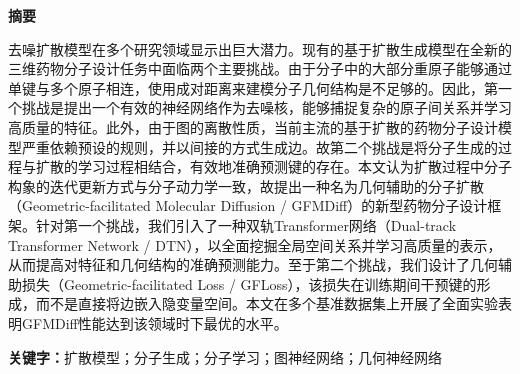 \cleardoublepage{}
\thispagestyle{previous}
\pagestyle{previous}
\setcounter{page}{1}

\clearpage
{}
\begin{center}
    \textbf{  \heiti 摘\quad 要}
\end{center}
\songti {}

去噪扩散模型在多个研究领域显示出巨大潜力。现有的基于扩散生成模型在全新的三维药物分子设计任务中面临两个主要挑战。由于分子中的大部分重原子能够通过单键与多个原子相连，使用成对距离来建模分子几何结构是不足够的。因此，第一个挑战是提出一个有效的神经网络作为去噪核，能够捕捉复杂的原子间关系并学习高质量的特征。此外，由于图的离散性质，当前主流的基于扩散的药物分子设计模型严重依赖预设的规则，并以间接的方式生成边。故第二个挑战是将分子生成的过程与扩散的学习过程相结合，有效地准确预测键的存在。本文认为扩散过程中分子构象的迭代更新方式与分子动力学一致，故提出一种名为几何辅助的分子扩散（Geometric-facilitated Molecular Diffusion / GFMDiff）的新型药物分子设计框架。针对第一个挑战，我们引入了一种双轨Transformer网络（Dual-track Transformer Network / DTN），以全面挖掘全局空间关系并学习高质量的表示，从而提高对特征和几何结构的准确预测能力。至于第二个挑战，我们设计了几何辅助损失（Geometric-facilitated Loss / GFLoss），该损失在训练期间干预键的形成，而不是直接将边嵌入隐变量空间。本文在多个基准数据集上开展了全面实验表明GFMDiff性能达到该领域时下最优的水平。


\vspace{20pt}
\noindent \textbf{关键字：}扩散模型；分子生成；分子学习；图神经网络；几何神经网络

